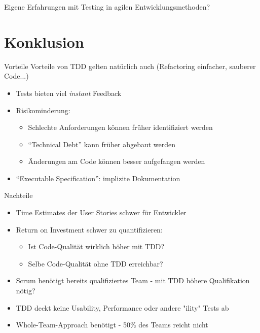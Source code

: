 \documentclass{f4_beamer_metropolis}
\begin{document}
\begin{frame}[standout]
  Eigene Erfahrungen mit Testing in agilen Entwicklungsmethoden?
\end{frame}

\section{Konklusion}

\begin{frame}{Vorteile}
Vorteile von TDD gelten natürlich auch (Refactoring einfacher, sauberer Code...)
\begin{itemize}
  \item Tests bieten viel \textit{instant} Feedback
  \item Risikominderung:
  \begin{itemize}
    \item Schlechte Anforderungen können früher identifiziert werden
    \item \enquote{Technical Debt} kann früher abgebaut werden
    \item Änderungen am Code können besser aufgefangen werden
  \end{itemize}
  \item \enquote{Executable Specification}: implizite Dokumentation
\end{itemize}
\end{frame}

\begin{frame}{Nachteile}
\begin{itemize}
  \item Time Estimates der User Stories schwer für Entwickler
  \item Return on Investment schwer zu quantifizieren:
  \begin{itemize}
    \item Ist Code-Qualität wirklich höher mit TDD?
    \item Selbe Code-Qualität ohne TDD erreichbar?
  \end{itemize}
  \item Scrum benötigt bereits qualifiziertes Team - mit TDD höhere Qualifikation nötig?
  \item TDD deckt keine Usability, Performance oder andere "ility" Tests ab
  \item Whole-Team-Approach benötigt - 50\% des Teams reicht nicht
\end{itemize}
\end{frame}
\end{document}
